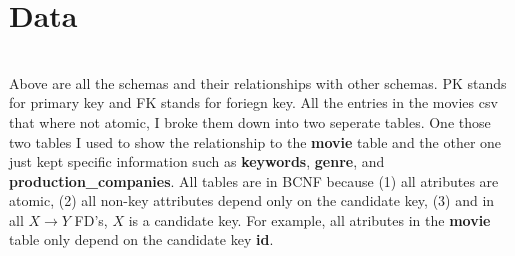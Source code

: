 \documentclass[11pt]{article}
\begin{document}
\section{Data}

	\vspace{2cm}\\
	Above are all the schemas and their relationships with other schemas.
	PK stands for primary key and FK stands for foriegn key. All the entries
	in the movies csv that where not atomic, I broke them down into two seperate tables.
	One those two tables I used to show the relationship to the \textbf{movie} table and the other
	one just kept specific information such as \textbf{keywords}, \textbf{genre}, and \textbf{production\_companies}.
	All tables are in BCNF because (1) all atributes are atomic, (2) all non-key attributes
	depend only on the candidate key, (3) and in all $X \rightarrow Y$ FD's, $X$ is a candidate
	key. For example, all atributes in the \textbf{movie} table only depend on the candidate key \textbf{id}.
\pagebreak
\end{document}
